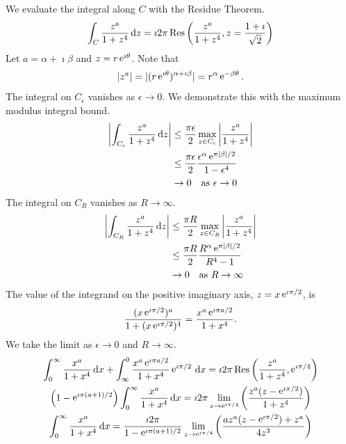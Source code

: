 {\begin{Solution}
  We evaluate the integral along $C$ with the Residue Theorem.
  \[
  \int_C \frac{z^a}{1 + z^4} \,\mathrm{d} z = \imath 2 \pi \mathop{\mathrm{Res}}\nolimits \left( \frac{z^a}{1+z^4},
    z = \frac{1 + \imath}{\sqrt{2}} \right)
  \]
  Let $a = \alpha + \imath \beta$ and $z = r \mathop{\mathrm{e}}\nolimits^{\imath \theta}$.  Note that
  \[
  |z^a| = | (r \mathop{\mathrm{e}}\nolimits^{\imath \theta})^{\alpha + \imath \beta} | = r^{\alpha} \mathop{\mathrm{e}}\nolimits^{- \beta \theta}.
  \]
  The integral on $C_\epsilon$ vanishes as $\epsilon \to 0$.  We demonstrate
  this with the maximum modulus integral bound.
  \begin{align*}
    \left| \int_{C_\epsilon} \frac{z^a}{1+z^4} \,\mathrm{d} z \right|
    &\leq \frac{\pi \epsilon}{2} \max_{z \in C_\epsilon}
    \left| \frac{z^a}{1+z^4} \right| \\
    &\leq \frac{\pi \epsilon}{2} \frac{\epsilon^\alpha \mathop{\mathrm{e}}\nolimits^{\pi |\beta|/2}}
    {1 - \epsilon^4} \\
    &\to 0 \quad \mathrm{as}\ \epsilon \to 0
  \end{align*}
  The integral on $C_R$ vanishes as $R \to \infty$.
  \begin{align*}
    \left| \int_{C_R} \frac{z^a}{1+z^4}\,\mathrm{d} z \right|
    &\leq \frac{\pi R}{2} \max_{z \in C_R}
    \left| \frac{z^a}{1+z^4} \right| \\
    &\leq \frac{\pi R}{2} \frac{R^\alpha \mathop{\mathrm{e}}\nolimits^{\pi |\beta| / 2}}
    { R^4 - 1 } \\
    &\to 0 \quad \mathrm{as}\ R \to \infty
  \end{align*}
  The value of the integrand on the positive imaginary axis,
  $z = x \mathop{\mathrm{e}}\nolimits^{\imath \pi/2}$, is
  \[
  \frac{ (x \mathop{\mathrm{e}}\nolimits^{\imath \pi/2} )^a }{ 1 + (x \mathop{\mathrm{e}}\nolimits^{\imath \pi/2} )^4 }
  = \frac{ x^a \mathop{\mathrm{e}}\nolimits^{\imath \pi a / 2} }{ 1 + x^4 }.
  \]
  We take the limit as $\epsilon \to 0$ and $R \to \infty$.
  \begin{gather*}
    \int_0^\infty \frac{x^a}{1 + x^4} \,\dd x
    + \int_\infty^0 \frac{ x^a \e^{\imath \pi a / 2} }{1 + x^4} \e^{\imath \pi/2} \,\dd x
    = \imath 2 \pi \Res \left( \frac{z^a}{1+z^4}, \e^{\imath \pi/4} \right) \\
    \left( 1 - \e^{\imath \pi (a+1) / 2} \right) \int_0^\infty \frac{x^a}{1 + x^4} \,\dd x
    = \imath 2 \pi \lim_{z \to \e^{\imath \pi/4} }
    \left( \frac{z^a (z - \e^{\imath \pi/2}) }{1+z^4} \right) \\
    \int_0^\infty \frac{x^a}{1 + x^4} \,\dd x
    = \frac{ \imath 2 \pi }{ 1 - \e^{\imath \pi (a+1) / 2} } \lim_{z \to \e^{\imath \pi/4} }
    \left( \frac{a z^a (z - \e^{\imath \pi/2}) + z^a }{4 z^3} \right) \\

\end{gather*}
\end{Solution}}
